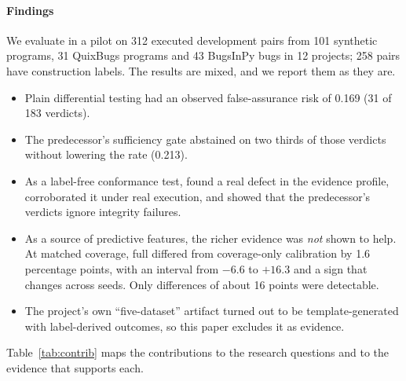 \paragraph*{Findings} We evaluate \sbg{} in a pilot on 312 executed development pairs from 101 synthetic programs, 31 QuixBugs programs and 43 BugsInPy bugs in 12 projects; 258 pairs have construction labels. The results are mixed, and we report them as they are.
\begin{itemize}
\item Plain differential testing had an observed false-assurance risk of 0.169 (31 of 183 \NDO{} verdicts).
\item The predecessor's sufficiency gate abstained on two thirds of those verdicts without lowering the rate (0.213).
\item As a label-free conformance test, \ers{} found a real defect in the evidence profile, corroborated it under real execution, and showed that the predecessor's verdicts ignore integrity failures.
\item As a source of predictive features, the richer evidence was \emph{not} shown to help. At matched coverage, full \cec{} differed from coverage-only calibration by 1.6 percentage points, with an interval from $-6.6$ to $+16.3$ and a sign that changes across seeds. Only differences of about 16 points were detectable.
\item The project's own ``five-dataset'' artifact turned out to be template-generated with label-derived outcomes, so this paper excludes it as evidence.
\end{itemize}

Table~\ref{tab:contrib} maps the contributions to the research questions and to the evidence that supports each.

